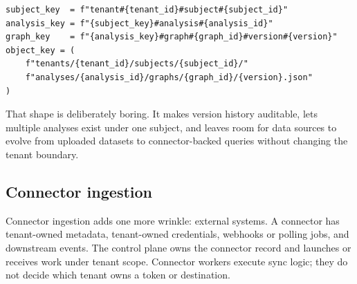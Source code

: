 \begin{lstlisting}[style=python, caption={Representative DataMap artifact key pattern.}]
subject_key  = f"tenant#{tenant_id}#subject#{subject_id}"
analysis_key = f"{subject_key}#analysis#{analysis_id}"
graph_key    = f"{analysis_key}#graph#{graph_id}#version#{version}"
object_key = (
    f"tenants/{tenant_id}/subjects/{subject_id}/"
    f"analyses/{analysis_id}/graphs/{graph_id}/{version}.json"
)
\end{lstlisting}

That shape is deliberately boring. It makes version history auditable, lets multiple analyses exist under one subject, and leaves room for data sources to evolve from uploaded datasets to connector-backed queries without changing the tenant boundary.

\subsection{Connector ingestion}

Connector ingestion adds one more wrinkle: external systems. A connector has tenant-owned metadata, tenant-owned credentials, webhooks or polling jobs, and downstream events. The control plane owns the connector record and launches or receives work under tenant scope. Connector workers execute sync logic; they do not decide which tenant owns a token or destination.

